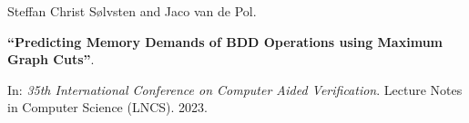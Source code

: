 Steffan Christ Sølvsten and Jaco van de Pol.

{\bf ``Predicting Memory Demands of BDD Operations using Maximum Graph Cuts''}.

In: \emph{35th International Conference on Computer Aided Verification}.
Lecture Notes in Computer Science (LNCS). 2023.

\label{cite:2023.tacas}